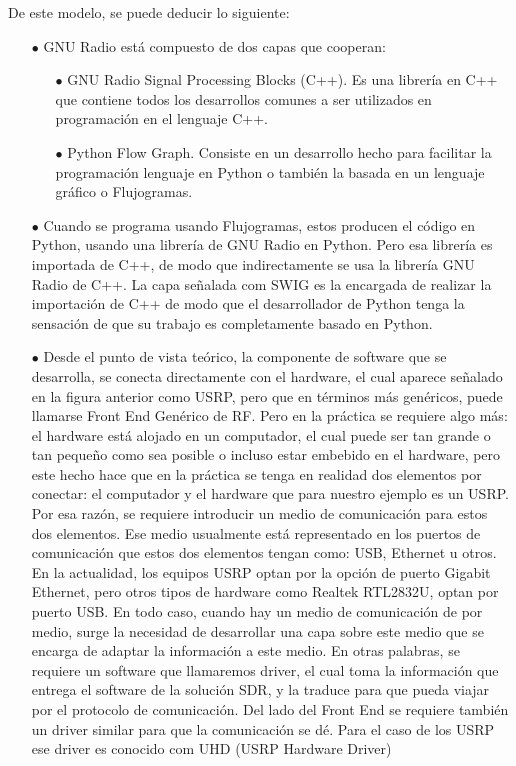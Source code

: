 De este modelo, se puede deducir lo siguiente: \\

\begin{itemize}
	\item [$\bullet$]GNU Radio está compuesto de dos capas que cooperan:	
	\begin{itemize}
		\item [$\bullet$] GNU Radio Signal Processing Blocks (C++). Es una librería en C++ que contiene todos los desarrollos comunes a ser utilizados en programación en el lenguaje C++.
		\item [$\bullet$] Python Flow Graph. Consiste en un desarrollo hecho para facilitar la programación lenguaje en Python o también la basada en un lenguaje gráfico o Flujogramas.
	\end{itemize}
	\item [$\bullet$] Cuando se programa usando Flujogramas, estos producen el código en Python, usando una librería de GNU Radio en Python. Pero esa librería es importada de C++, de modo que indirectamente se usa la librería GNU Radio de C++. La capa señalada com SWIG es la encargada de realizar la importación de C++ de modo que el desarrollador de Python tenga la sensación de que su trabajo es completamente basado en Python.
	\item [$\bullet$] Desde el punto de vista teórico, la componente de software que se desarrolla, se conecta directamente con el hardware, el cual aparece señalado en la figura anterior como USRP, pero que en términos más genéricos, puede llamarse Front End Genérico de RF. Pero en la práctica se requiere algo más: el hardware está alojado en un computador, el cual puede ser tan grande o tan pequeño como sea posible o incluso estar embebido en el hardware, pero este hecho hace que en la práctica se tenga en realidad dos elementos por conectar: el computador y el hardware que para nuestro ejemplo es un USRP. Por esa razón, se requiere introducir un medio de comunicación para estos dos elementos. Ese medio usualmente está representado en los puertos de comunicación que estos dos elementos tengan como: USB, Ethernet u otros.  En la actualidad, los equipos USRP optan por la opción de puerto Gigabit Ethernet, pero otros tipos de hardware como Realtek RTL2832U, optan por puerto USB. En todo caso, cuando hay un medio de comunicación de por medio, surge la necesidad de desarrollar una capa sobre este medio que se encarga de adaptar la información a este medio. En otras palabras, se requiere un software que llamaremos driver, el cual toma la información que entrega el software de la solución SDR, y la traduce para que pueda viajar por el  protocolo de comunicación. Del lado del Front End se requiere también un driver similar para que la comunicación se dé. Para el caso de los USRP ese driver es conocido com UHD (USRP Hardware Driver)
\end{itemize}



